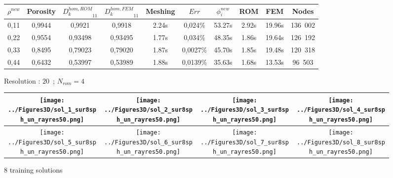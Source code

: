 \begin{figure}[H]%
%
\begin{center}
\begin{tabular}{|c|c||c|c||c|c||c|c||c||c|}
\hline
\rowcolor{lightgray} $\rho^{new}$&Porosity&${D_k^{hom,ROM}}_{11}$&${D_k^{hom,FEM}}_{11}$&Meshing&$Err$&$\phi_i^{new}$&ROM&FEM&Nodes\\
\hline
0,11&0,9944&0,9921&0,9918&2.24s&0,024\%&53.27s&2.92s&19.96s&136\ 002\\
\hline
0,22&0,9554&0,93498&0,93495&1.77s&0,034\%&48.35s&1.86s&19.64s&126\ 192\\
\hline
0,33&0,8495&0,79023&0,79020&1.87s&0,0027\%&45.70s&1.85s&19.48s&120\ 318\\
\hline
0,44&0,6432&0,53997&0,53989&1.88s&0,0139\%&35.63s&1.68s&13.53s&96\ 503\\
\hline
\end{tabular}
\end{center}
\caption{Resolution : $20$\ ; $N_{rom}=4$}
%
\end{figure}

\ligneinter
\begin{figure}[H]%
%
\begin{center}
\begin{tabular}{|c|c|c|c|}
\hline
\texttt{[image: ../Figures3D/sol\_1\_sur8sph\_un\_rayres50.png]}%
&%
\texttt{[image: ../Figures3D/sol\_2\_sur8sph\_un\_rayres50.png]}%
&%
\texttt{[image: ../Figures3D/sol\_3\_sur8sph\_un\_rayres50.png]}%
&%
\texttt{[image: ../Figures3D/sol\_4\_sur8sph\_un\_rayres50.png]}%
\\
\hline
\texttt{[image: ../Figures3D/sol\_5\_sur8sph\_un\_rayres50.png]}%
&%
\texttt{[image: ../Figures3D/sol\_6\_sur8sph\_un\_rayres50.png]}%
&%
\texttt{[image: ../Figures3D/sol\_7\_sur8sph\_un\_rayres50.png]}%
&%
\texttt{[image: ../Figures3D/sol\_8\_sur8sph\_un\_rayres50.png]}%
\\
\hline
\end{tabular}
\end{center}
\caption{$8$ training solutions}
%
\end{figure}


